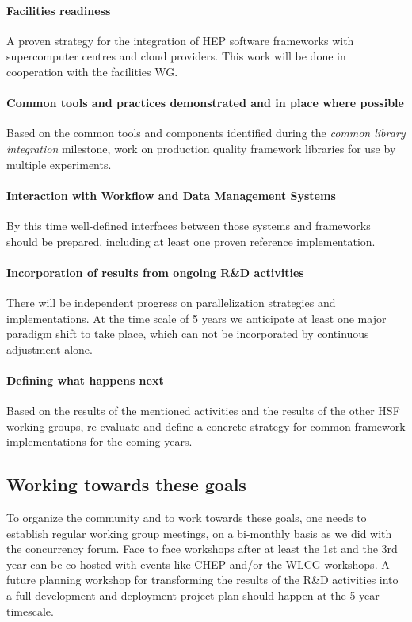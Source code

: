 \documentclass[12pt,a4paper]{article}
\begin{document}
\paragraph{Facilities readiness} A proven strategy for the integration
of HEP software frameworks with supercomputer centres and cloud
providers.  This work will be done in cooperation with the facilities
WG.

\paragraph{Common tools and practices demonstrated and in place where
  possible} Based on the common tools and components identified during
the \emph{common library integration} milestone, work on production
quality framework libraries for use by multiple experiments.

\paragraph{Interaction with Workflow and Data Management Systems} By
this time well-defined interfaces between those systems and frameworks
should be prepared, including at least one proven reference
implementation.

\paragraph{Incorporation of results from ongoing R\&D activities}
There will be independent progress on parallelization strategies and
implementations. At the time scale of 5 years we anticipate at least
one major paradigm shift to take place, which can not be incorporated
by continuous adjustment alone.

\paragraph{Defining what happens next} Based on the results of the
mentioned activities and the results of the other HSF working groups,
re-evaluate and define a concrete strategy for common framework
implementations for the coming years.

\subsection{Working towards these goals}
\label{sec:towards-goals}

To organize the community and to work towards these goals, one needs
to establish regular working group meetings, on a bi-monthly basis as
we did with the concurrency forum. Face to face workshops after at
least the 1st and the 3rd year can be co-hosted with events like CHEP
and/or the WLCG workshops. A future planning workshop for transforming
the results of the R\&D activities into a full development and
deployment project plan should happen at the 5-year timescale.


\sloppy
\raggedright
\clearpage
\printbibliography[title={References},heading=bibintoc]
\end{document}
